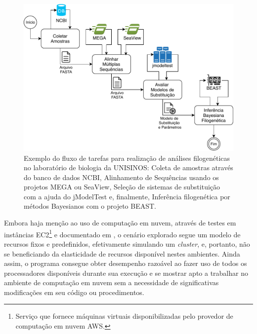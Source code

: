 \documentclass[english,brazilian]{UNISINOSmonografia} %
\newcommand\defaultFigureWidth{0.9}
\begin{document}
\begin{figure}[tb]
\centering%
\begin{minipage}{\defaultFigureWidth\textwidth}
	\caption[Exemplo do fluxo de tarefas para realização de análises filogenéticas no laboratório de biologia da UNISINOS]{Exemplo do fluxo de tarefas para realização de análises filogenéticas no laboratório de biologia da UNISINOS: Coleta de amostras através do banco de dados NCBI, Alinhamento de Sequências usando os projetos MEGA ou SeaView, Seleção de sistemas de substituição com a ajuda do jModelTest e, finalmente, Inferência filogenética por métodos Bayesianos com o projeto BEAST.}
	\label{fig:modelo-workflow-unisinos}
	\vspace{1ex}
	\includegraphics[width=\textwidth]{workflow-biologia}
\end{minipage}
\end{figure}

Embora haja menção ao uso de computação em nuvem, através de testes em instâncias 
EC2\footnote{
	Serviço que fornece máquinas virtuais disponibilizadas pelo provedor de computação em nuvem AWS.
} 
e documentado em , o cenário explorado segue um modelo de recursos fixos e predefinidos, efetivamente simulando um \textit{cluster}, e, portanto, não se beneficiando da elasticidade de recursos disponível nestes ambientes.
Ainda assim, o programa consegue obter desempenho razoável ao fazer uso de todos os processadores disponíveis durante sua execução e se mostrar apto a trabalhar no ambiente de computação em nuvem sem a necessidade de significativas modificações em seu código ou procedimentos.
\end{document}
